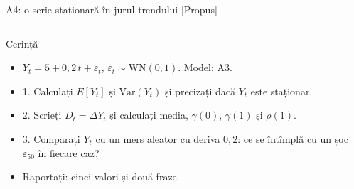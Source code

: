 \begin{frame}{A4: o serie staționară în jurul trendului [Propus]}
\propsub
\itemsize{\scriptsize}
\begin{columns}[T]
\begin{column}{\taskw}
\begin{block}{Cerință}
\begin{itemize}
    \item $Y_t = 5 + 0{,}2\,t + \varepsilon_t$, $\varepsilon_t \sim \mathrm{WN}(0, 1)$. Model: A3.
    \item 1. Calculați $E[Y_t]$ și $\mathrm{Var}(Y_t)$ și precizați dacă $Y_t$ este staționar.
    \item 2. Scrieți $D_t = \Delta Y_t$ și calculați media, $\gamma(0)$, $\gamma(1)$ și $\rho(1)$.
    \item 3. Comparați $Y_t$ cu un mers aleator cu deriva $0{,}2$: ce se întîmplă cu un șoc $\varepsilon_{50}$ în fiecare caz?
    \item Raportați: cinci valori și două fraze.
\end{itemize}
\end{block}
\end{column}
\begin{column}{\solw}
\end{column}
\end{columns}
\end{frame}

